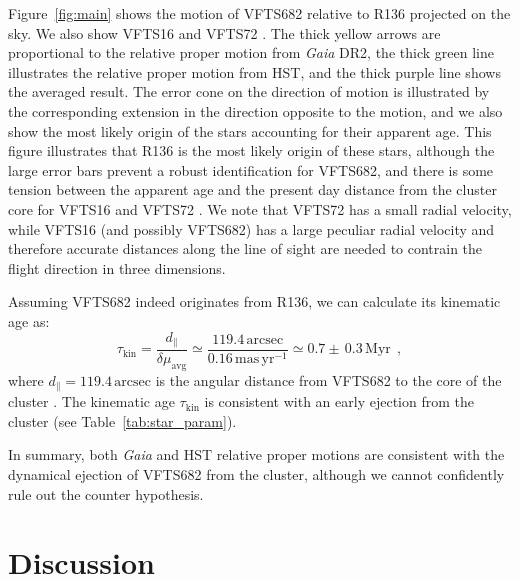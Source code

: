 \documentclass[a4paper,fleqn,usenatbib]{mnras}
\newcommand{\masyr}{\,\mathrm{mas}\,\mathrm{yr}^{-1}}
\DeclareRobustCommand{\Tabref}[1]{Table~\ref{#1}}
\begin{document}
Figure~\ref{fig:main} shows the motion of VFTS682 relative to R136
projected on the
sky. We also show VFTS16 and VFTS72 %
\citep[see][]{lennon:18}. The thick yellow arrows are proportional to
the relative proper motion from \emph{Gaia} DR2, the thick green
line illustrates the relative proper motion from HST, and the thick
purple line shows the averaged result. The error cone
on the direction of motion is illustrated by the corresponding
extension in the direction opposite to the motion, and we also show
the most likely origin of the stars accounting for their apparent age.
This figure illustrates that R136 is the most likely origin of these stars, although the large error bars
prevent a robust identification for VFTS682, and there is some tension
between the apparent age and the present day distance from the cluster
core for VFTS16 and VFTS72 \citep[][]{lennon:18}. We note that
VFTS72 has a small radial velocity, while VFTS16 (and possibly VFTS682) has
a large peculiar radial velocity and therefore accurate distances along
the line of sight are
needed to contrain the flight direction in three dimensions.


Assuming VFTS682 indeed originates from R136, we can calculate its kinematic
age as:
\begin{equation}
  \label{eq:kin_age}
  \tau_\mathrm{kin} = \frac{d_\parallel}{\delta\mu_\mathrm{avg}} \simeq
  \frac{119.4\,\mathrm{arcsec}}{0.16\masyr} \simeq 0.7\pm\,0.3\, \mathrm{Myr} \ \ ,
\end{equation}
where $d_\parallel = 119.4\,\mathrm{arcsec}$ is the angular distance from VFTS682 to
the core of the cluster \citep[][]{bestenlehner:11}. %
The kinematic age $\tau_\mathrm{kin}$ is consistent with an early
ejection from the cluster (see \Tabref{tab:star_param}).

In summary, both \emph{Gaia} and HST relative proper motions are consistent with the dynamical ejection of
VFTS682 from the cluster, although we cannot confidently rule out the
counter hypothesis. 
\vspace*{-20pt}
\section{Discussion}
\label{sec:discussion}
\end{document}
